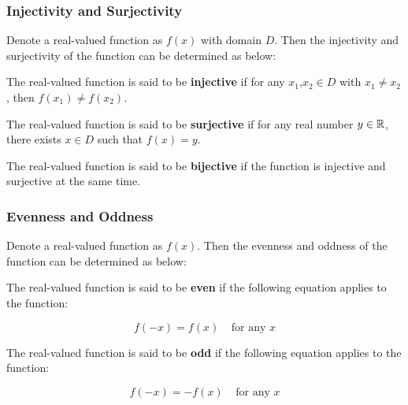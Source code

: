 \documentclass[a4paper,12pt]{article}
\begin{document}
\subsubsection{Injectivity and Surjectivity}
\begin{dft}
  Denote a real-valued function as $f(x)$ with domain $D$. Then the injectivity and surjectivity of the function can be determined as below:
  \begin{alist}
    \item The real-valued function is said to be \textbf{injective} if for any $x_{1}\text{,}x_{2}\in D$ with $x_{1}\neq x_{2}$, then $f(x_{1})\neq f(x_{2})$.
    \item The real-valued function is said to be \textbf{surjective} if for any real number $y\in \mathbb{R}$, there exists $x\in D$ such that $f(x)=y$.
    \item The real-valued function is said to be \textbf{bijective} if the function is injective and surjective at the same time.
  \end{alist}
\end{dft}

\subsubsection{Evenness and Oddness}
\begin{dft}
  Denote a real-valued function as $f(x)$. Then the evenness and oddness of the function can be determined as below:
  \begin{alist}
    \item The real-valued function is said to be \textbf{even} if the following equation applies to the function:

    $$f(-x)=f(x)\;\;\;\;\text{for any }x$$
    \item The real-valued function is said to be \textbf{odd} if the following equation applies to the function:

    $$f(-x)=-f(x)\;\;\;\;\text{for any }x$$
  \end{alist}
\end{dft}
\end{document}
